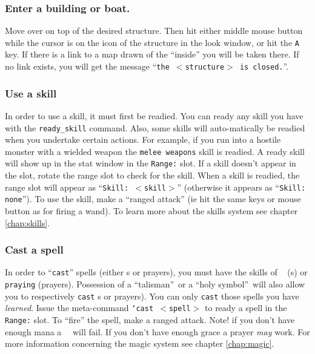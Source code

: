 \subsubsection{Enter a building or boat.}
Move over on top of the desired structure. Then hit either middle mouse
button while the cursor is on the icon of the structure in the look window, 
or hit the {\tt A} key. If there is a link to a map drawn of the ``inside'' 
you will be taken there. If no link exists, you will get the message
``{\tt the $<$structure$>$ is closed.}''. \\ 

\subsubsection{Use a skill}
In order to use a skill, it must first be readied. You can ready any skill 
you have with the {\tt ready\_skill} command. Also, some skills will 
auto-matically be readied when you undertake certain
actions. For example, if you run into a hostile monster with a wielded weapon
the {\tt melee weapons} skill is readied. A ready skill will show up in the 
stat window in the {\tt Range:} slot. If a skill doesn't appear in the slot, rotate 
the range slot to check for the skill. When a skill is readied, the range slot will
appear as ``{\tt Skill: $<$skill$>$}'' (otherwise it appears as 
``{\tt Skill: none}''). 
To use the skill, make a ``ranged attack'' (ie hit the same keys or
mouse button as for firing a wand). To learn more about the skills
system see chapter \ref{chap:skills}. \\ 

\subsubsection{Cast a spell} 
In order to ``{\tt cast}'' spells (either \incantation s or prayers), you must have 
the skills of {\tt \spellcasting\ } (\incantation s) or {\tt praying} (prayers). 
Possession 
of a ``talisman''\ or a ``holy symbol''\ 
will also allow you to respectively {\tt cast} \incantation s or prayers). You can 
only {\tt cast} those spells you have {\em learned}. Issue the meta-command 
{\tt `cast $<$spell$>$} to ready a spell in the {\tt Range:} slot. To 
``fire'' the spell, make 
a ranged attack. Note! if you don't have enough mana a\ina\ \incantation\ 
{\em} will fail.
If you don't have enough grace a prayer {\em may} work. For more information
concerning the magic system see chapter \ref{chap:magic}.

